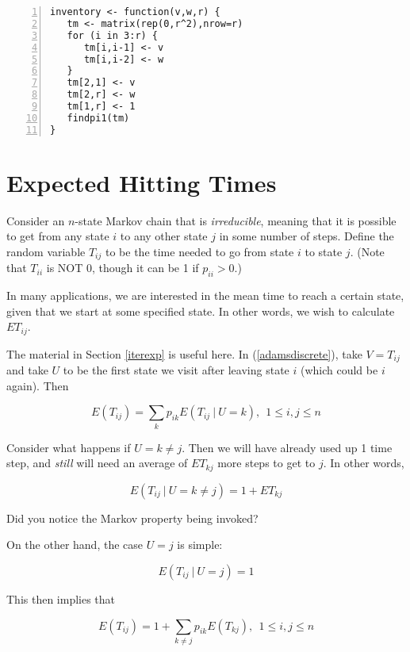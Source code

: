\begin{lstlisting}[numbers=left]
inventory <- function(v,w,r) {
   tm <- matrix(rep(0,r^2),nrow=r)
   for (i in 3:r) {
      tm[i,i-1] <- v
      tm[i,i-2] <- w
   }
   tm[2,1] <- v
   tm[2,r] <- w
   tm[1,r] <- 1
   findpi1(tm)
}
\end{lstlisting}

\section{Expected Hitting Times}

Consider an $n$-state Markov chain that is {\it irreducible},
meaning that it is possible to get from any state $i$ to any other state
$j$ in some number of steps.  Define the random variable $T_{ij}$ to be
the time needed to go from state $i$ to state $j$.  (Note that $T_{ii}$
is NOT 0, though it can be 1 if $p_{ii} > 0$.)

In many applications, we are interested in the mean time to reach a
certain state, given that we start at some specified state.  In other
words, we wish to calculate $ET_{ij}$.

The material in Section \ref{iterexp} is useful here.  In
(\ref{adamsdiscrete}), take $V = T_{ij}$ and take $U$ to be the first
state we visit after leaving state $i$ (which could be $i$ again).  Then

\begin{equation}
\label{etij}
E(T_{ij}) = \sum_{k} p_{ik} E(T_{ij} ~|~ U = k), ~~
1 \leq i,j \leq n
\end{equation}

Consider what happens if $U = k \neq j$.  Then we will have already used
up 1 time step, and {\it still} will need an average of $ET_{kj}$ more
steps to get to $j$.  In other words,

\begin{equation}
E(T_{ij} ~|~ U = k \neq j) = 1 + ET_{kj}
\end{equation}

Did you notice the Markov property being invoked?

On the other hand, the case $U = j$ is simple:

\begin{equation}
E(T_{ij} ~|~ U = j) = 1 
\end{equation}

This then implies that

\begin{equation}
\label{etij1}
E(T_{ij}) 
= 1 + \sum_{k \neq j} p_{ik} E(T_{kj}), ~~
1 \leq i,j \leq n
\end{equation}

